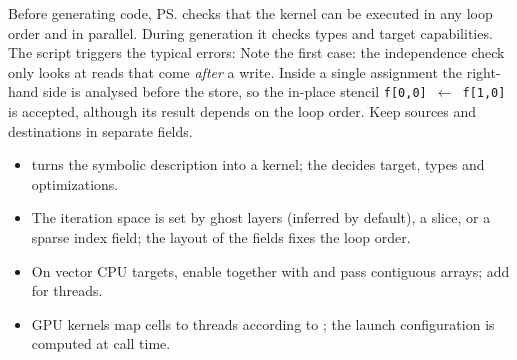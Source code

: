 Before generating code, \ps{} checks that the kernel can be executed in any loop order
and in parallel. During generation it checks types and target capabilities. The script
 triggers the typical errors:
Note the first case: the independence check only looks at reads that come
\emph{after} a write. Inside a single assignment the right-hand side is analysed before
the store, so the in-place stencil \texttt{f[0,0]}~$\leftarrow$~\texttt{f[1,0]} is accepted, although its
result depends on the loop order. Keep sources and destinations in separate fields.

\begin{keyidea}[Summary]
  \begin{itemize}[leftmargin=1.2em]
    \item {} turns the symbolic description into a
          kernel; the  decides target, types and optimizations.
    \item The iteration space is set by ghost layers (inferred by default), a slice, or a
          sparse index field; the layout of the fields fixes the loop order.
    \item On vector CPU targets, enable  together with
           and pass contiguous arrays; add
           for threads.
    \item GPU kernels map cells to threads according to ; the
          launch configuration is computed at call time.
  \end{itemize}
\end{keyidea}
